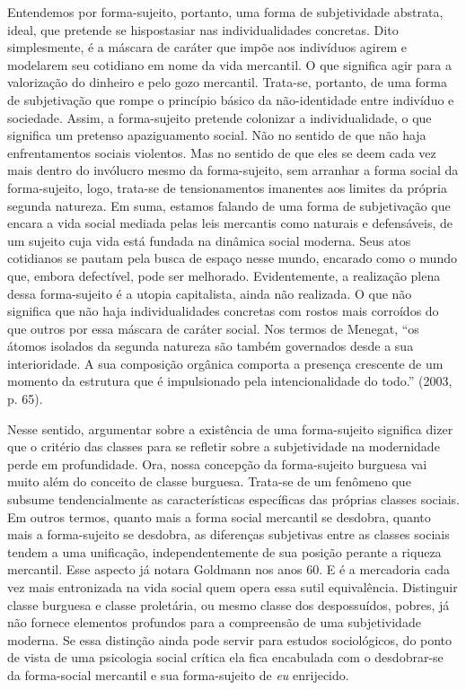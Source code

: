 Entendemos por forma-sujeito, portanto, uma forma de subjetividade
abstrata, ideal, que pretende se hispostasiar nas individualidades
concretas. Dito simplesmente, é a máscara de caráter que impõe aos
indivíduos agirem e modelarem seu cotidiano em nome da vida mercantil. O
que significa agir para a valorização do dinheiro e pelo gozo mercantil.
Trata-se, portanto, de uma forma de subjetivação que rompe o princípio
básico da não-identidade entre indivíduo e sociedade. Assim, a
forma-sujeito pretende colonizar a individualidade, o que significa um
pretenso apaziguamento social. Não no sentido de que não haja
enfrentamentos sociais violentos. Mas no sentido de que eles se deem
cada vez mais dentro do invólucro mesmo da forma-sujeito, sem arranhar a
forma social da forma-sujeito, logo, trata-se de tensionamentos
imanentes aos limites da própria segunda natureza. Em suma, estamos
falando de uma forma de subjetivação que encara a vida social mediada
pelas leis mercantis como naturais e defensáveis, de um sujeito cuja
vida está fundada na dinâmica social moderna. Seus atos cotidianos se
pautam pela busca de espaço nesse mundo, encarado como o mundo que,
embora defectível, pode ser melhorado. Evidentemente, a realização plena
dessa forma-sujeito é a utopia capitalista, ainda não realizada. O que
não significa que não haja individualidades concretas com rostos mais
corroídos do que outros por essa máscara de caráter social. Nos termos
de Menegat, ``os átomos isolados da segunda natureza são também
governados desde a sua interioridade. A sua composição orgânica comporta
a presença crescente de um momento da estrutura que é impulsionado pela
intencionalidade do todo.'' (2003, p. 65).

Nesse sentido, argumentar sobre a existência de uma forma-sujeito
significa dizer que o critério das classes para se refletir sobre a
subjetividade na modernidade perde em profundidade. Ora, nossa concepção
da forma-sujeito burguesa vai muito além do conceito de classe burguesa.
Trata-se de um fenômeno que subsume tendencialmente as características
específicas das próprias classes sociais. Em outros termos, quanto mais
a forma social mercantil se desdobra, quanto mais a forma-sujeito se
desdobra, as diferenças subjetivas entre as classes sociais tendem a uma
unificação, independentemente de sua posição perante a riqueza
mercantil. Esse aspecto já notara Goldmann nos anos 60. E é a mercadoria
cada vez mais entronizada na vida social quem opera essa sutil
equivalência. Distinguir classe burguesa e classe proletária, ou mesmo
classe dos despossuídos, pobres, já não fornece elementos profundos para
a compreensão de uma subjetividade moderna. Se essa distinção ainda pode
servir para estudos sociológicos, do ponto de vista de uma psicologia
social crítica ela fica encabulada com o desdobrar-se da forma-social
mercantil e sua forma-sujeito de \emph{eu} enrijecido.

